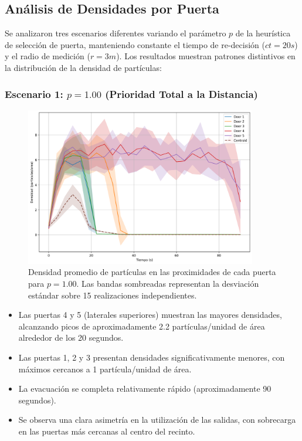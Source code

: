 \documentclass[12pt]{article}
\begin{document}
\subsection{Análisis de Densidades por Puerta}

Se analizaron tres escenarios diferentes variando el parámetro $p$ de la heurística de selección de puerta, manteniendo constante el tiempo de re-decisión ($ct=20s$) y el radio de medición ($r=3m$). Los resultados muestran patrones distintivos en la distribución de la densidad de partículas:

\subsubsection{Escenario 1: $p = 1.00$ (Prioridad Total a la Distancia)}

\begin{figure}[H]
    \centering
    \includegraphics[width=0.9\textwidth]{img/circular_density_t_20_&_p_1.00.png}
    \caption{Densidad promedio de partículas en las proximidades de cada puerta para $p=1.00$. Las bandas sombreadas representan la desviación estándar sobre 15 realizaciones independientes.}
    \label{fig:densidad_p100}
\end{figure}

\begin{itemize}
    \item Las puertas 4 y 5 (laterales superiores) muestran las mayores densidades, alcanzando picos de aproximadamente 2.2 partículas/unidad de área alrededor de los 20 segundos.
    \item Las puertas 1, 2 y 3 presentan densidades significativamente menores, con máximos cercanos a 1 partícula/unidad de área.
    \item La evacuación se completa relativamente rápido (aproximadamente 90 segundos).
    \item Se observa una clara asimetría en la utilización de las salidas, con sobrecarga en las puertas más cercanas al centro del recinto.
\end{itemize}
\end{document}
